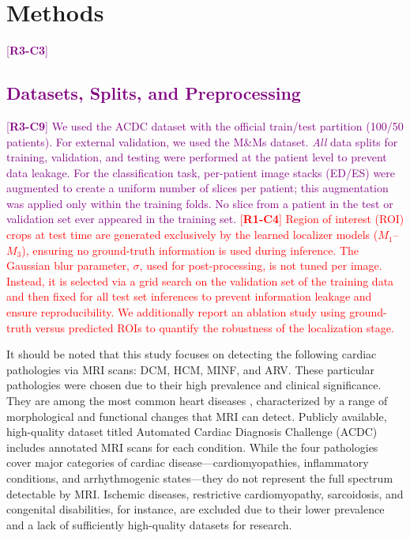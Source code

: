 \documentclass[fleqn,10pt]{wlscirep}
\newcommand{\revtag}[2]{[\textbf{R#1-C#2}]}
\newcommand{\Rone}[1]{\textcolor{red}{#1}}
\newcommand{\Rthree}[1]{\textcolor{purple}{#1}}
\begin{document}
\section*{Methods}

\Rthree{\revtag{3}{3}\subsection*{Datasets, Splits, and Preprocessing}}
\Rthree{\revtag{3}{9} %
We used the ACDC dataset\cite{Bernard:2018} with the official train/test partition (100/50 patients). For external validation, we used the M\&Ms dataset\cite{Campello:2021}. \emph{All} data splits for training, validation, and testing were performed at the patient level to prevent data leakage. For the classification task, per-patient image stacks (ED/ES) were augmented to create a uniform number of slices per patient; this augmentation was applied only within the training folds. No slice from a patient in the test or validation set ever appeared in the training set. 
}
\Rone{\revtag{1}{4} %
Region of interest (ROI) crops at test time are generated exclusively by the learned localizer models ($M_1$–$M_3$), ensuring no ground-truth information is used during inference. The Gaussian blur parameter, $\sigma$, used for post-processing, is not tuned per image. Instead, it is selected via a grid search on the validation set of the training data and then fixed for all test set inferences to prevent information leakage and ensure reproducibility. We additionally report an ablation study using ground-truth versus predicted ROIs to quantify the robustness of the localization stage.
}

It should be noted that this study focuses on detecting the following cardiac pathologies via MRI scans: DCM, HCM, MINF, and ARV. These particular pathologies were chosen due to their high prevalence and clinical significance. They are among the most common heart diseases \cite{Wang:2023,McKenna:2017}, characterized by a range of morphological and functional changes that MRI can detect. Publicly available, high-quality dataset titled Automated Cardiac Diagnosis Challenge (ACDC) \cite{Bernard:2018} includes annotated MRI scans for each condition. While the four pathologies cover major categories of cardiac disease—cardiomyopathies, inflammatory conditions, and arrhythmogenic states—they do not represent the full spectrum detectable by MRI. Ischemic diseases, restrictive cardiomyopathy, sarcoidosis, and congenital disabilities, for instance, are excluded due to their lower prevalence and a lack of sufficiently high-quality datasets for research.
\end{document}

